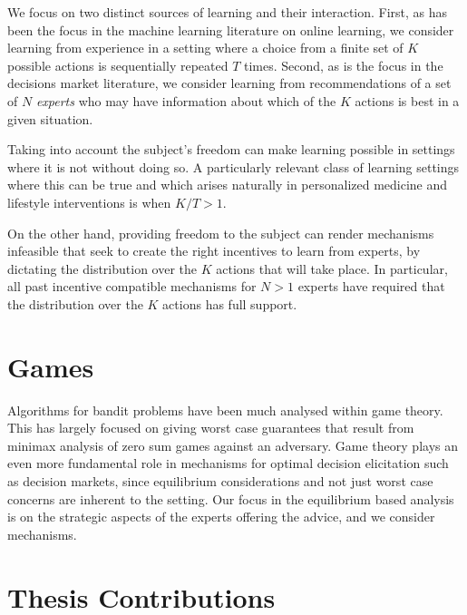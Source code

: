 We focus on two distinct sources of learning and their interaction.
First, as has been the focus in the machine learning literature on online learning, we consider learning from experience in a setting where a choice from a finite set of $K$ possible actions is sequentially repeated $T$ times.
Second, as is the focus in the decisions market literature, we consider learning from recommendations of a set of $N$ \emph{experts} who may have information about which of the $K$ actions is best in a given situation.


Taking into account the subject's freedom can make learning possible in settings where it is not without doing so.
A particularly relevant class of learning settings where this can be true and which arises naturally in personalized medicine and lifestyle interventions is when $K/T > 1$.

On the other hand, providing freedom to the subject can render mechanisms infeasible that seek to create the right incentives to learn from experts, by dictating the distribution over the $K$ actions that will take place.
In particular, all past incentive compatible mechanisms for $N>1$ experts have required that the distribution over the $K$ actions has full support.


\section{Games}

Algorithms for bandit problems have been much analysed within game theory.
This has largely focused on giving worst case guarantees that result from minimax analysis of zero sum games against an adversary.
Game theory plays an even more fundamental role in mechanisms for optimal decision elicitation such as decision markets, since equilibrium considerations and not just worst case concerns are inherent to the setting.
Our focus in the equilibrium based analysis is on the strategic aspects of the experts offering the advice, and we consider mechanisms.



\section{Thesis Contributions}


